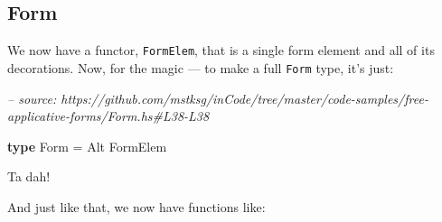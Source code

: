 \documentclass[]{article}
\newenvironment{Shaded}{}{}
\newcommand{\CommentTok}[1]{\textcolor[rgb]{0.38,0.63,0.69}{\textit{#1}}}
\newcommand{\DataTypeTok}[1]{\textcolor[rgb]{0.56,0.13,0.00}{#1}}
\newcommand{\FunctionTok}[1]{\textcolor[rgb]{0.02,0.16,0.49}{#1}}
\newcommand{\KeywordTok}[1]{\textcolor[rgb]{0.00,0.44,0.13}{\textbf{#1}}}
\begin{document}
\hypertarget{form}{%
\subsection{Form}\label{form}}

We now have a functor, \texttt{FormElem}, that is a single form element and all
of its decorations. Now, for the magic --- to make a full \texttt{Form} type,
it's just:

\begin{Shaded}
\begin{Highlighting}[]
\CommentTok{-- source: https://github.com/mstksg/inCode/tree/master/code-samples/free-applicative-forms/Form.hs#L38-L38}

\KeywordTok{type} \DataTypeTok{Form} \FunctionTok{=} \DataTypeTok{Alt} \DataTypeTok{FormElem}
\end{Highlighting}
\end{Shaded}

Ta dah!

And just like that, we now have functions like:
\end{document}
